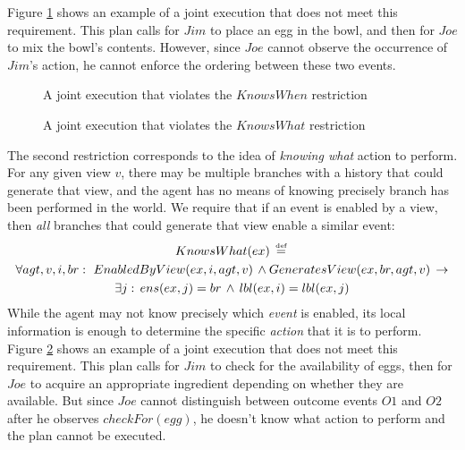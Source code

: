 Figure \ref{fig:not-knows-when} shows an example of a joint execution
that does not meet this requirement. This plan calls for $Jim$ to
place an egg in the bowl, and then for $Joe$ to mix the bowl's contents.
However, since $Joe$ cannot observe the occurrence of $Jim$'s action,
he cannot enforce the ordering between these two events.

%
\begin{figure}[!t]

\caption{A joint execution that violates the $KnowsWhen$ restriction}


\label{fig:not-knows-when} 
\end{figure}


%
\begin{figure}[!t]

\caption{A joint execution that violates the $KnowsWhat$ restriction}


\label{fig:not-knows-what} 
\end{figure}


The second restriction corresponds to the idea of \emph{knowing what}
action to perform. For any given view $v$, there may be multiple
branches with a history that could generate that view, and the agent
has no means of knowing precisely branch has been performed in the
world. We require that if an event is enabled by a view, then \emph{all}
branches that could generate that view enable a similar event:\begin{multline*}
KnowsWhat(ex)\,\stackrel{\mbox{\tiny def}}{=}\,\\
\forall agt,v,i,br:\,\, EnabledByView(ex,i,agt,v)\,\wedge GeneratesView(ex,br,agt,v)\,\rightarrow\\
\exists j:\, ens(ex,j)=br\,\wedge\, lbl(ex,i)=lbl(ex,j)\end{multline*}
 While the agent may not know precisely which \emph{event} is enabled,
its local information is enough to determine the specific \emph{action}
that it is to perform. Figure \ref{fig:not-knows-what} shows an example
of a joint execution that does not meet this requirement. This plan
calls for $Jim$ to check for the availability of eggs, then for $Joe$
to acquire an appropriate ingredient depending on whether they are
available. But since $Joe$ cannot distinguish between outcome events
$O1$ and $O2$ after he observes $checkFor(egg)$, he doesn't know
what action to perform and the plan cannot be executed.

